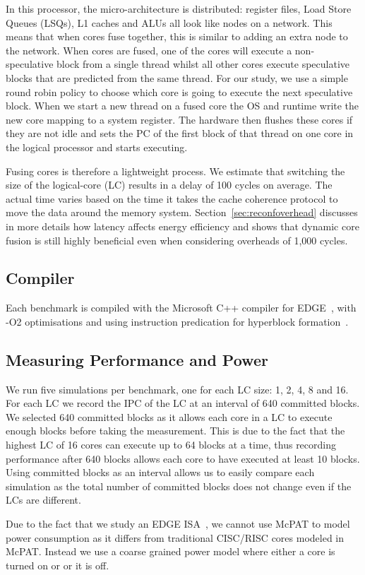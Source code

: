 In this processor, the micro-architecture is distributed: register files, Load Store Queues (LSQs), L1 caches and ALUs all look like nodes on a network.
This means that when cores fuse together, this is similar to adding an extra node to the network.
When cores are fused, one of the cores will execute a non-speculative block from a single thread whilst all other cores execute speculative blocks that are predicted from the same thread.
For our study, we use a simple round robin policy to choose which core is going to execute the next speculative block.
When we start a new thread on a fused core the OS and runtime write the new core mapping to a system register.
The hardware then flushes these cores if they are not idle and sets the PC of the first block of that thread on one core in the logical processor and starts executing.

Fusing cores is therefore a lightweight process.
We estimate that switching the size of the logical-core (LC) results in a delay of 100 cycles on average.
The actual time varies based on the time it takes the cache coherence protocol to move the data around the memory system.
Section~\ref{sec:reconfoverhead} discusses in more details how latency affects energy efficiency and shows that dynamic core fusion is still highly beneficial even when considering overheads of 1,000 cycles.

\subsection{Compiler}
Each benchmark is compiled with the Microsoft C++ compiler for EDGE~\cite{e2}, with -O2 optimisations and using instruction predication for hyperblock formation~\cite{smith2006edge}.

\subsection{Measuring Performance and Power}

We run five simulations per benchmark, one for each LC size: 1, 2, 4, 8 and 16.
For each LC we record the IPC of the LC at an interval of 640 committed blocks.
We selected 640 committed blocks as it allows each core in a LC to execute enough blocks before taking the measurement.
This is due to the fact that the highest LC of 16 cores can execute up to 64 blocks at a time, thus recording performance after 640 blocks allows each core to have executed at least 10 blocks.
Using committed blocks as an interval allows us to easily compare each simulation as the total number of committed blocks does not change even if the LCs are different.

Due to the fact that we study an EDGE ISA~\cite{smith2006edge}, we cannot use McPAT to model power consumption as it differs from traditional CISC/RISC cores modeled in McPAT.
Instead we use a coarse grained power model where either a core is turned on or or it is off. 
